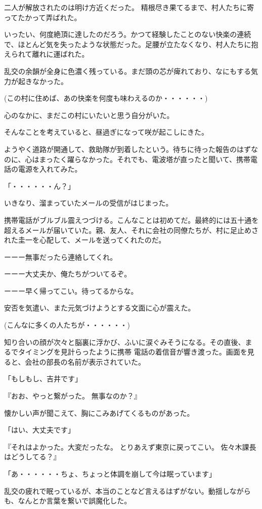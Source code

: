 ﻿\documentclass[book,tate]{jlreq}
\begin{document}
二人が解放されたのは明け方近くだった。 精根尽き果てるまで、村人たちに寄ってたかって弄ばれた。

いったい、何度絶頂に達したのだろう。かつて経験したことのない快楽の連続で、ほとんど気を失ったような状態だった。足腰が立たなくなり、村人たちに抱えられて離れに運ばれた。

乱交の余韻が全身に色濃く残っている。まだ頭の芯が痺れており、なにもする気力が起きなかった。

(この村に住めば、あの快楽を何度も味わえるのか・・・・・・)

心のなかに、まだこの村にいたいと思う自分がいた。

そんなことを考えていると、昼過ぎになって咲が起こしにきた。

ようやく道路が開通して、救助隊が到着したという。待ちに待った報告のはずなのに、心はまったく躍らなかった。それでも、電波塔が直ったと聞いて、携帯電話の電源を入れてみた。

「・・・・・・ん？」

いきなり、溜まっていたメールの受信がはじまった。

携帯電話がブルブル震えつづける。こんなことは初めてだ。最終的には五十通を超えるメールが届いていた。親、友人、それに会社の同僚たちが、村に足止めされた圭一を心配して、メールを送ってくれたのだ。

ーーー無事だったら連絡してくれ。

ーーー大丈夫か、俺たちがついてるぞ。

ーーー早く帰ってこい。待ってるからな。

安否を気遣い、また元気づけようとする文面に心が震えた。

(こんなに多くの人たちが・・・・・・)

知り合いの顔が次々と脳裏に浮かび、ふいに涙ぐみそうになる。その直後、まるでタイミングを見計らったように携帯 電話の着信音が響き渡った。画面を見ると、会社の部長の名前が表示されていた。

「もしもし、吉井です」

『おお、やっと繋がった。 無事なのか？』

懐かしい声が聞こえて、胸にこみあげてくるものがあった。

「はい、大丈夫です」

『それはよかった。大変だったな。 とりあえず東京に戻ってこい。 佐々木課長はどうしてる？』

「あ・・・・・・ちょ、ちょっと体調を崩して今は眠っています」

乱交の疲れで眠っているが、本当のことなど言えるはずがない。動揺しながらも、なんとか言葉を繋いで誤魔化した。
\end{document}
